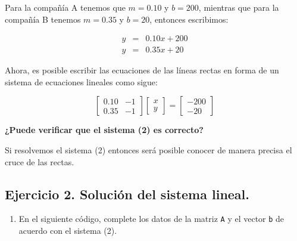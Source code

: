 \documentclass[
  letterpaper,
  DIV=11,
  numbers=noendperiod]{scrreprt}
\providecommand{\tightlist}{%
  \setlength{\itemsep}{0pt}\setlength{\parskip}{0pt}}\usepackage{longtable,booktabs,array}
\begin{document}
Para la compañía A tenemos que \(m = 0.10\) y \(b = 200\), mientras que
para la compañía B tenemos \(m = 0.35\) y \(b = 20\), entonces
escribimos:

\[
\begin{array}{ccc}
y & = & 0.10 x + 200 \\
y & = & 0.35 x + 20
\end{array}
\]

Ahora, es posible escribir las ecuaciones de las líneas rectas en forma
de un sistema de ecuaciones lineales como sigue:

\[
\left[
\begin{array}{cc}
0.10 & -1 \\
0.35 & -1
\end{array} \right]
\left[
\begin{array}{c}
x \\
y
\end{array} \right] =
\left[
\begin{array}{c}
-200 \\ 
-20
\end{array} \right] \tag{2}
\]

\textbf{¿Puede verificar que el sistema (2) es correcto?}

Si resolvemos el sistema (2) entonces será posible conocer de manera
precisa el cruce de las rectas.

\subsection{Ejercicio 2. Solución del sistema
lineal.}\label{ejercicio-2.-soluciuxf3n-del-sistema-lineal.}

\begin{enumerate}
\def\labelenumi{\arabic{enumi}.}
\tightlist
\item
  En el siguiente código, complete los datos de la matriz \texttt{A} y
  el vector \texttt{b} de acuerdo con el sistema (2).
\end{enumerate}
\end{document}
